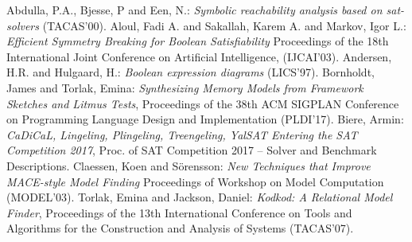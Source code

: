 \documentclass[10pt]{article}
\theoremstyle{definition}
\begin{document}
  \clearpage
  \begin{thebibliography}{999}
        Abdulla, P.A., Bjesse, P and Een, N.:
        \emph{Symbolic reachability analysis based on sat-solvers}
        (TACAS'00).
        Aloul, Fadi A. and Sakallah, Karem A. and Markov, Igor L.:
        \emph{Efficient Symmetry Breaking for Boolean Satisfiability}
        Proceedings of the 18th International Joint Conference on Artificial Intelligence, (IJCAI'03).
        Andersen, H.R. and Hulgaard, H.:
        \emph{Boolean expression diagrams}
        (LICS'97).
        Bornholdt, James and Torlak, Emina:
        \emph{Synthesizing Memory Models from Framework Sketches and Litmus Tests},
        Proceedings of the 38th ACM SIGPLAN Conference on Programming Language Design and Implementation (PLDI'17).
        Biere, Armin:
        \emph{CaDiCaL, Lingeling, Plingeling, Treengeling, YalSAT Entering the SAT Competition 2017}, Proc. of SAT Competition 2017 -- Solver and Benchmark Descriptions.
        Claessen, Koen and S{\"o}rensson:
        \emph{New Techniques that Improve {MACE}-style Model Finding}
        Proceedings of Workshop on Model Computation (MODEL'03).
        Torlak, Emina and Jackson, Daniel:
        \emph{Kodkod: A Relational Model Finder},
        Proceedings of the 13th International Conference on Tools and Algorithms for the Construction and Analysis of Systems (TACAS'07).
    \end{thebibliography}
\end{document}
